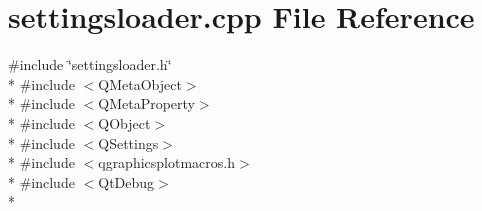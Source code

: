 \section{settingsloader.\+cpp File Reference}
\label{bk3_2properties_2settingsloader_8cpp}
{\ttfamily \#include \char`\"{}settingsloader.\+h\char`\"{}}\\*
{\ttfamily \#include $<$Q\+Meta\+Object$>$}\\*
{\ttfamily \#include $<$Q\+Meta\+Property$>$}\\*
{\ttfamily \#include $<$Q\+Object$>$}\\*
{\ttfamily \#include $<$Q\+Settings$>$}\\*
{\ttfamily \#include $<$qgraphicsplotmacros.\+h$>$}\\*
{\ttfamily \#include $<$Qt\+Debug$>$}\\*

